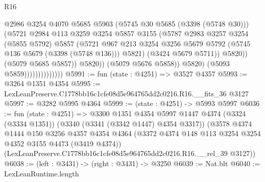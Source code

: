 \begin{lexlean}{R16}
\begin{coremodule}
                                          @2986
                                          @3254
                                          @4070
                                          @5685
                                          @5903
                                          (@5745 @30 @5685 (@3398 (@5748 @30)))
                                          (@5721
                                            @2984
                                            @113
                                            @3259
                                            @3254
                                            @5857
                                            @3155
                                            (@5787
                                              @2983
                                              @3257
                                              @3254
                                              (@5855 @5792)
                                              @5857
                                              (@5721
                                                @967
                                                @213
                                                @3254
                                                @3256
                                                @5679
                                                @5792
                                                (@5745 @136 @5679 (@3398 (@5748 @136)))
                                                @5821)
                                              (@3424 @5679 @5711))
                                            @5820))
                                        (@5079 @5685 @5857))
                                      @5820))
                                  (@5079 @5676 @5858))
                                @5820)
                              (@5093 @5859))))))))))))))
@5991 := fun (state : @4251) => @3527 @4357
@5993 := @3264 @1351 @4354
@5995 := LexLeanPreserve.C1778bb16c1cfe08d5e964765dd2c0216.R16.__fits_36 @3127
@5997 := @3282 @5995 @4364
@5999 := (state : @4251) -> @5993 @5997
@6036 := fun (state : @4251) =>
  @3300
    @1351
    @4354
    @5997
    @1447
    @4374
    (@3324 (@3334 @1351))
    (@3340 (@3341 (@3342 @1447) @4354 @3317))
    (@3578
      @4374
      @1444
      @150
      @3256
      @4357
      @4354
      @4364
      (@3372 @4374 @148 @113 @3254 @3254 @4352 @3155 @4473 (@3419 @4374))
      (LexLeanPreserve.C1778bb16c1cfe08d5e964765dd2c0216.R16.__rel_39 @3127))
@6038 := (left : @3431) -> (right : @3431) -> @3250
@6039 := Nat.blt
@6040 := LexLeanRuntime.length

\end{coremodule}
\end{lexlean}
